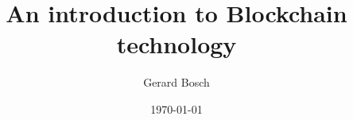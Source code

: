 \documentclass[notitlepage, usenames,dvipsnames]{beamer}
\title[Introduction to Blockchain Technology]{An introduction to Blockchain technology}
\author[Gerard Bosch]{Gerard Bosch}
\institute{\email{gerard.bosch@gmail.com}}
\date{\today}
\newcommand{\st}{\structure}
\begin{document}

\end{document}
